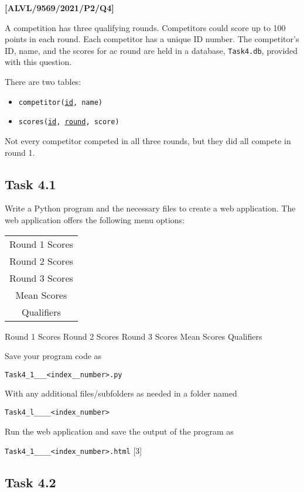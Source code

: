 \item \textbf{{[}ALVL/9569/2021/P2/Q4{]} }

A competition has three qualifying rounds. Competitors could score
up to 100 points in each round. Each competitor has a unique ID number.
The competitor's ID, name, and the scores for ac round are held in
a database, \texttt{Task4.db}, provided with this question. 

There are two tables: 
\begin{itemize}
\item \texttt{competitor(}\texttt{\uline{id}}\texttt{, name) }
\item \texttt{scores(}\texttt{\uline{id}}\texttt{, }\texttt{\uline{round}}\texttt{,
score)} 
\end{itemize}
Not every competitor competed in all three rounds, but they did all
compete in round 1. 

\subsection*{Task 4.1 }

Write a Python program and the necessary files to create a web application.
The web application offers the following menu options: 
\noindent \begin{center}
\begin{tabular}{|c|}
\hline 
Round 1 Scores\tabularnewline
Round 2 Scores\tabularnewline
Round 3 Scores\tabularnewline
Mean Scores\tabularnewline
Qualifiers\tabularnewline
\hline 
\end{tabular}
\par\end{center}

Round 1 Scores Round 2 Scores Round 3 Scores Mean Scores Qualifiers 

Save your program code as 

\texttt{Task4\_1\_<your name>\_<centre number>\_<index\_\_number>.py }

With any additional files/subfolders as needed in a folder named 

\texttt{Task4\_l\_<your name>\_<centre number>\_\_<index\_number> }

Run the web application and save the output of the program as 

\texttt{Task4\_1\_\_<your name>\_<centre number>\_<index\_number>.html}
\hfill{}{[}3{]}

\subsection*{Task 4.2}

